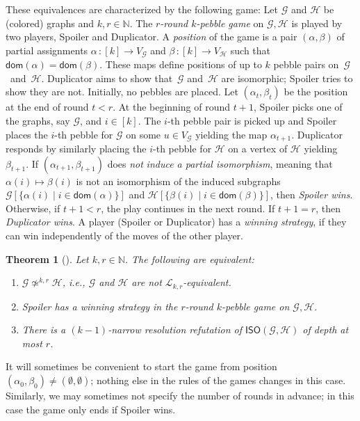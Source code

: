 \documentclass[10pt,a4paper]{article}
\newcommand{\defining}[1]{\emph{#1}}
\newcommand{\nat}{\mathbb{N}}
\newcommand{\kmlogic}[2]{\mathscr{L}_{#1, #2}}
\newcommand{\graphG}{\mathcal{G}}
\newcommand{\graphH}{\mathcal{H}}
\newcommand{\vertexG}{V_{\graphG}}
\newcommand{\vertexH}{V_{\graphH}}
\newcommand{\dom}{\mathsf{dom}}
\newcommand{\ISO}{\mathsf{ISO}(\graphG, \graphH)}
\newcommand{\notkequivr}[2]{\not\simeq^{#1,#2}}
\newtheorem{theorem}{Theorem}
\begin{document}
These equivalences are characterized by the following game:
Let $\graphG$ and $\graphH$ be (colored) graphs and $k, r \in \mathbb{N}$. The \defining{$r$-round $k$-pebble game} on $\graphG, \graphH$ is played by two players, Spoiler and Duplicator.
A \defining{position} of the game is a pair $(\alpha,\beta)$ of partial assignments $\alpha \, \colon [k] \to \vertexG$ and $\beta \, \colon [k] \to \vertexH$ such that $\dom(\alpha) = \dom(\beta)$. 
These maps define positions of up to $k$ pebble pairs on~$\graphG$~and~$\graphH$.
Duplicator aims to show that~$\graphG$ and~$\graphH$ are isomorphic; Spoiler tries to show they are not.
Initially, no pebbles are placed. Let $(\alpha_t, \beta_t)$ be the position at the end of round $t < r$. At the beginning of round $t+1$, Spoiler picks one of the graphs, say $\graphG$, and $i \in [k]$. The $i$-th pebble pair is picked up and Spoiler places the $i$-th pebble for $\graphG$ on some $u \in \vertexG$ yielding the map $\alpha_{t+1}$.
Duplicator responds by similarly placing the $i$-th pebble for $\graphH$ on a vertex of $\graphH$ yielding $\beta_{t+1}$. 
If $(\alpha_{t+1}, \beta_{t+1})$ does \emph{not} \defining{induce a partial isomorphism}, meaning that $\alpha(i) \mapsto \beta(i)$ is not an isomorphism of the induced subgraphs $\graphG[\{\alpha(i) \mid i \in \dom(\alpha)\}]$ and $\graphH[\{\beta(i) \mid i \in \dom(\beta)\}]$,
then \defining{Spoiler wins}.
Otherwise, if $t+1 <r$, the play continues in the next round.
If $t+1=r$, then \defining{Duplicator wins}.
A player (Spoiler or Duplicator) has a \defining{winning strategy},
if they can win independently of the moves of the other player.


\begin{theorem}[\cite{DBLP:journals/jcss/Immerman82, DBLP:journals/tocl/ToranW23}] \label{thm: logic_equiv}
Let $k,r \in \nat$. The following are equivalent:
\begin{enumerate}
\item $\graphG \notkequivr{k}{r} \graphH$, i.e., $\graphG$ and $\graphH$ are \emph{not} $\kmlogic{k}{r}$-equivalent.
\item Spoiler has a winning strategy in the $r$-round $k$-pebble game on $\graphG, \graphH$.
\item There is a $(k-1)$-narrow resolution refutation of $\ISO$ of depth at most $r$.
\end{enumerate}
\end{theorem}

\noindent It will sometimes be convenient to start the game from position $(\alpha_0, \beta_0) \neq (\emptyset, \emptyset)$; nothing else in the rules of the games changes in this case. 
Similarly, we may sometimes not specify the number of rounds in advance; in this case the game only ends if Spoiler wins. 
\end{document}
